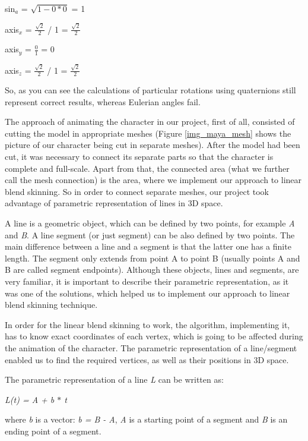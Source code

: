 \documentclass[times, 10pt,twocolumn]{article}
\begin{document}
sin$_{a}$ = $\sqrt{1 - 0 \ast 0}$ = 1

axis$_{x}$ = $\frac{\sqrt{2}}{2}$ / 1 = $\frac{\sqrt{2}}{2}$

axis$_{y}$ = $\frac{0}{1}$ = 0

axis$_{z}$ = $\frac{\sqrt{2}}{2}$ / 1 = $\frac{\sqrt{2}}{2}$

So, as you can see the calculations of particular rotations using quaternions still represent correct results, whereas Eulerian angles fail.




\label{line_in_space_section}

The approach of animating the character in our project, first of all, consisted of cutting the model in appropriate meshes (Figure \ref{img_maya_mesh} shows the picture of our character being cut in separate meshes).  After the model had been cut, it was necessary to connect its separate parts so that the character is complete and full-scale. Apart from that, the connected area (what we further call the mesh connection) is the area, where we implement our approach to linear blend skinning. So in order to connect separate meshes, our project took advantage of parametric representation of lines in 3D space.

A line is a geometric object, which can be defined by two points, for example \emph{A} and \emph{B}. A line segment (or just segment) can be also defined by two points. The main difference between a line and a segment is that the latter one has a finite length. The segment only extends from point A to point B (usually points A and B are called segment endpoints). Although these objects, lines and segments, are very familiar, it is important to describe their parametric representation, as it was one of the solutions, which helped us to implement our approach to linear blend skinning technique.

In order for the linear blend skinning to work, the algorithm, implementing it, has to know exact coordinates of each vertex, which is going to be affected during the animation of the character. The parametric representation of a line/segment enabled us to find the required vertices, as well as their positions in 3D space.

The parametric representation of a line \emph{L} can be written as:
\begin{center}
\emph{L(t) = A + b $\ast$ t}
\end{center}
where \emph{b} is a vector: \emph{b = B - A}, \emph{A} is a starting point of a segment and \emph{B} is an ending point of a segment.
\end{document}

